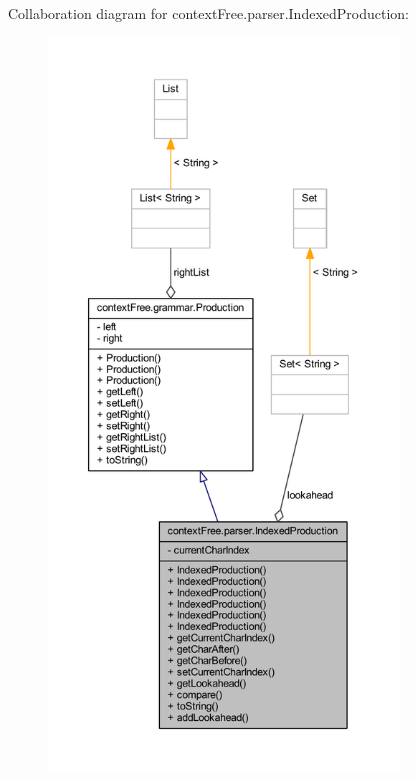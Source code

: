 Collaboration diagram for context\-Free.\-parser.\-Indexed\-Production\-:
\nopagebreak
\begin{figure}[H]
\begin{center}
\leavevmode
\includegraphics[height=550pt]{classcontext_free_1_1parser_1_1_indexed_production__coll__graph}
\end{center}
\end{figure}
